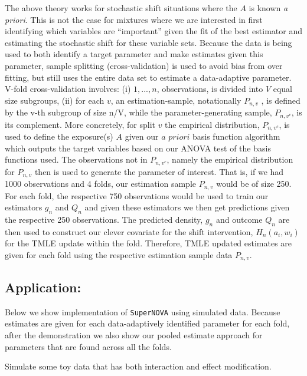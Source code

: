\documentclass[
]{article}
\begin{document}
The above theory works for stochastic shift situations where the \(A\)
is known \textit{a priori}. This is not the case for mixtures where we
are interested in first identifying which variables are ``important''
given the fit of the best estimator and estimating the stochastic shift
for these variable sets. Because the data is being used to both identify
a target parameter and make estimates given this parameter, sample
splitting (cross-validation) is used to avoid bias from over fitting,
but still uses the entire data set to estimate a data-adaptive
parameter. V-fold cross-validation involves: (i) \({1,..., n}\),
observations, is divided into \(V\) equal size subgroups, (ii) for each
\(v\), an estimation-sample, notationally \(P_{n,v}\) , is defined by
the v-th subgroup of size n/V, while the parameter-generating sample,
\(P_{n,v^c}\), is its complement. More concretely, for split \(v\) the
empirical distribution, \(P_{n,v^c}\), is used to define the exposure(s)
\(A\) given our \(\textit{a priori}\) basis function algorithm which
outputs the target variables based on our ANOVA test of the basis
functions used. The observations not in \(P_{n,v^c}\), namely the
empirical distribution for \(P_{n,v}\) then is used to generate the
parameter of interest. That is, if we had 1000 observations and 4 folds,
our estimation sample \(P_{n,v}\) would be of size 250. For each fold,
the respective 750 observations would be used to train our estimators
\(g_n\) and \(Q_n\) and given these estimators we then get predictions
given the respective 250 observations. The predicted density, \(g_n\)
and outcome \(Q_n\) are then used to construct our clever covariate for
the shift intervention, \(H_n(a_i, w_i)\) for the TMLE update within the
fold. Therefore, TMLE updated estimates are given for each fold using
the respective estimation sample data \(P_{n,v}\).

\hypertarget{application}{%
\subsection{Application:}\label{application}}

Below we show implementation of \texttt{SuperNOVA} using simulated data.
Because estimates are given for each data-adaptively identified
parameter for each fold, after the demonstration we also show our pooled
estimate approach for parameters that are found across all the folds.

Simulate some toy data that has both interaction and effect
modification.
\end{document}
